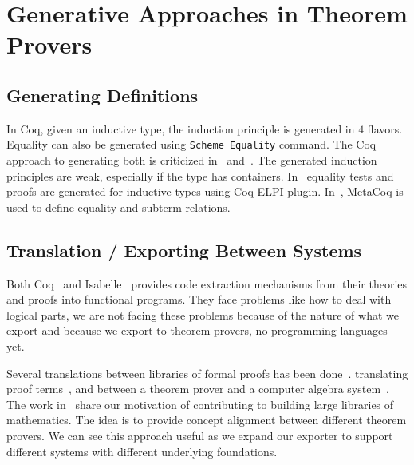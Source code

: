 \section{Generative Approaches in Theorem Provers}

\subsection{Generating Definitions}
In Coq, given an inductive type, the induction principle is generated in $4$ flavors. Equality can also be generated using \verb|Scheme Equality| command. The Coq approach to generating both is criticized in~\cite{coqDeriveEquality2019} and~\cite{coqDeriveSubterm2020}. The generated induction principles are weak, especially if the type has containers.  In~\cite{coqDeriveEquality2019} equality tests and proofs are generated for inductive types using Coq-ELPI plugin. In~\cite{coqDeriveSubterm2020}, MetaCoq is used to define equality and subterm relations. 

 

\subsection{Translation / Exporting Between Systems}
Both Coq~\cite{CoqCodegen2003, cruz2003program} and Isabelle~\cite{IsabelleCodegen2010} provides code extraction mechanisms from their theories and proofs into functional programs. They face problems like how to deal with logical parts, we are not facing these problems because of the nature of what we export and because we export to theorem provers, no programming languages yet. 

Several translations between libraries of formal proofs has been done~\cite{impsToOmdoc2018, mizarToIsabelle2018, iancu2013mizar}. translating proof terms~\cite{kaliszyk2019DeclProofTerms}, and between a theorem prover and a computer algebra system~\cite{Lewis_2017}. 
The work in~\cite{Muller2017alignment} share our motivation of contributing to building large libraries of mathematics. The idea is to provide concept alignment between different theorem provers. We can see this approach useful as we expand our exporter to support different systems with different underlying foundations.  

